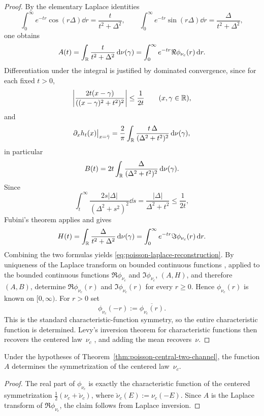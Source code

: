 \begin{proof}
By the elementary Laplace identities
\[
\int_0^\infty e^{-tr}\cos(r\Delta)\dd r=\frac{t}{t^2+\Delta^2},
\qquad
\int_0^\infty e^{-tr}\sin(r\Delta)\dd r=\frac{\Delta}{t^2+\Delta^2},
\]
one obtains
\[
A(t)
=\int_{\mathbb{R}}\frac{t}{t^2+\Delta^2}\,\mathrm{d}\nu(\gamma)
=\int_0^\infty e^{-tr}\Re\phi_{\nu_c}(r)\,\mathrm{d} r.
\]
Differentiation under the integral is justified by dominated convergence,
since for each fixed $t>0$,
\[
\left|\frac{2t(x-\gamma)}{((x-\gamma)^2+t^2)^2}\right|
\le \frac{1}{2t}
\qquad(x,\gamma\in\mathbb{R}),
\]
and
\[
\partial_x h_t(x)\big|_{x=\bar\gamma}
=\frac{2}{\pi}\int_{\mathbb{R}}\frac{t\,\Delta}{(\Delta^2+t^2)^2}\,\mathrm{d}\nu(\gamma),
\]
in particular
\[
B(t)=2t\int_{\mathbb{R}}\frac{\Delta}{(\Delta^2+t^2)^2}\,\mathrm{d}\nu(\gamma).
\]
Since
\[
\int_t^\infty \frac{2s|\Delta|}{(\Delta^2+s^2)^2}\dd s
=\frac{|\Delta|}{\Delta^2+t^2}
\le \frac{1}{2t},
\]
Fubini's theorem applies and gives
\[
H(t)
=\int_{\mathbb{R}}\frac{\Delta}{t^2+\Delta^2}\,\mathrm{d}\nu(\gamma)
=\int_0^\infty e^{-tr}\Im\phi_{\nu_c}(r)\,\mathrm{d} r.
\]
Combining the two formulas yields
\eqref{eq:poisson-laplace-reconstruction}.  By uniqueness of the Laplace
transform on bounded continuous functions \cite{Widder1941}, applied to
the bounded continuous functions $\Re\phi_{\nu_c}$ and $\Im\phi_{\nu_c}$,
$(A,H)$, and therefore $(A,B)$, determine $\Re\phi_{\nu_c}(r)$ and
$\Im\phi_{\nu_c}(r)$ for every $r\ge 0$.  Hence $\phi_{\nu_c}(r)$ is known
on $[0,\infty)$.  For $r>0$ set
\[
\phi_{\nu_c}(-r):=\overline{\phi_{\nu_c}(r)}.
\]
This is the standard characteristic-function symmetry, so the entire
characteristic function is determined.  Levy's inversion theorem for
characteristic functions then recovers the centered law~$\nu_c$
\cite{Lukacs1970,Feller1971}, and adding the mean recovers~$\nu$.
\end{proof}

\begin{corollary}%
\label{cor:poisson-symmetrization}
Under the hypotheses of Theorem~\ref{thm:poisson-central-two-channel}, the
function $A$ determines the symmetrization of the centered law~$\nu_c$.
\end{corollary}

\begin{proof}
The real part of $\phi_{\nu_c}$ is exactly the characteristic function of
the centered symmetrization
$\frac12(\nu_c+\check\nu_c)$, where $\check\nu_c(E):=\nu_c(-E)$.  Since
$A$ is the Laplace transform of $\Re\phi_{\nu_c}$, the claim follows from
Laplace inversion.
\end{proof}

